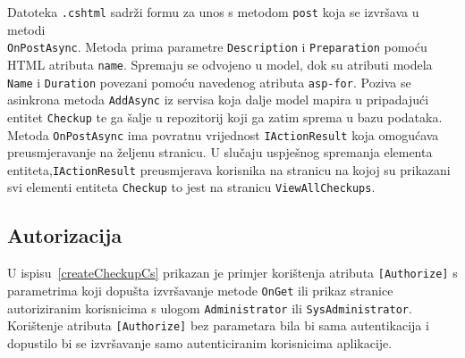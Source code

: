 Datoteka \texttt{.cshtml} sadrži formu za unos s metodom \texttt{post} koja se izvršava u metodi\\\texttt{OnPostAsync}. Metoda prima parametre \texttt{Description} i \texttt{Preparation} pomoću HTML atributa \texttt{name}. Spremaju se odvojeno u model, dok su atributi modela \texttt{Name} i \texttt{Duration} povezani pomoću navedenog atributa \texttt{asp-for}. Poziva se asinkrona metoda \texttt{AddAsync} iz servisa koja dalje model mapira u pripadajući entitet \texttt{Checkup} te ga šalje u repozitorij koji ga zatim sprema u bazu podataka. Metoda \texttt{OnPostAsync} ima povratnu vrijednost \texttt{IActionResult} koja omogućava preusmjeravanje na željenu stranicu. U slučaju uspješnog spremanja elementa entiteta,\texttt{IActionResult} preusmjerava korisnika na stranicu na kojoj su prikazani svi elementi entiteta \texttt{Checkup} to jest na stranicu \texttt{ViewAllCheckups}.

\subsection{Autorizacija}
U ispisu~\ref{createCheckupCs} prikazan je primjer korištenja atributa \texttt{[Authorize]} s parametrima koji dopušta izvršavanje metode \texttt{OnGet} ili prikaz stranice autoriziranim korisnicima s ulogom \texttt{Administrator} ili \texttt{SysAdministrator}. Korištenje atributa \texttt{[Authorize]} bez parametara bila bi sama autentikacija i dopustilo bi se izvršavanje samo autenticiranim korisnicima aplikacije\cite{aspNetCoreAuthentication}.